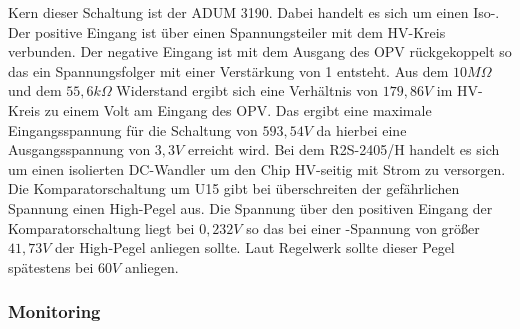 Kern dieser Schaltung ist der ADUM 3190. Dabei handelt es sich um einen Iso-. Der positive Eingang ist über einen Spannungsteiler mit dem \ac{HV}-Kreis verbunden. Der negative Eingang ist mit dem Ausgang des \ac{OPV} rückgekoppelt so das ein Spannungsfolger mit einer Verstärkung von 1 entsteht. Aus dem \ensuremath{10 M\Omega} und dem \ensuremath{55,6 k\Omega} Widerstand ergibt sich eine Verhältnis von \ensuremath{179,86 V} im \ac{HV}-Kreis zu einem Volt am Eingang des \ac{OPV}. Das ergibt eine maximale Eingangsspannung für die Schaltung von \ensuremath{593,54 V} da hierbei eine Ausgangsspannung von \ensuremath{3,3 V} erreicht wird. Bei dem R2S-2405/H handelt es sich um einen isolierten DC-Wandler um den Chip \ac{HV}-seitig mit Strom zu versorgen. Die Komparatorschaltung um U15 gibt bei überschreiten der gefährlichen Spannung einen High-Pegel aus. Die Spannung über den positiven Eingang der Komparatorschaltung liegt bei \ensuremath{0,232 V} so das bei einer -Spannung von größer \ensuremath{41,73 V} der High-Pegel anliegen sollte. Laut Regelwerk sollte dieser Pegel spätestens bei \ensuremath{60V} anliegen.

\FloatBarrier
\subsubsection{ Monitoring}

